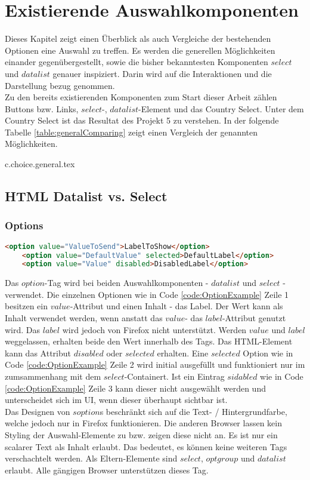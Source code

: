 \chapter{Existierende Auswahlkomponenten}

Dieses Kapitel zeigt einen Überblick als auch Vergleiche der bestehenden Optionen eine Auswahl zu treffen. 
Es werden die generellen Möglichkeiten einander gegenübergestellt, sowie die bisher bekanntesten Komponenten $select$ und $datalist$ genauer inspiziert.
Darin wird auf die Interaktionen und die Darstellung bezug genommen. 
\\
Zu den bereits existierenden Komponenten zum Start dieser Arbeit zählen Buttons bzw. Links, $select$-, $datalist$-Element und das Country Select.
Unter dem Country Select ist das Resultat des Projekt 5 zu verstehen.
In der folgende Tabelle \ref{table:generalComparing} zeigt einen Vergleich der genannten Möglichkeiten.

{c.choice.general.tex}


\section{HTML Datalist vs. Select}

\subsection{Options}

\begin{lstlisting}[language = html, caption = Code: Option Example, label = code:OptionExample]
    <option value="ValueToSend">LabelToShow</option>
    <option value="DefaultValue" selected>DefaultLabel</option>
    <option value="Value" disabled>DisabledLabel</option>
\end{lstlisting}

Das $option$-Tag wird bei beiden Auswahlkomponenten - $datalist$ und $select$ - verwendet. 
Die einzelnen Optionen wie in Code \ref{code:OptionExample} Zeile 1 besitzen ein $value$-Attribut und einen Inhalt - das Label.
Der Wert kann als Inhalt verwendet werden, wenn anstatt das $value$- das $label$-Attribut genutzt wird.
Das $label$ wird jedoch von Firefox nicht unterstützt.
Werden $value$ und $label$ weggelassen, erhalten beide den Wert innerhalb des Tags.
Das HTML-Element kann das Attribut $disabled$ oder $selected$ erhalten.
Eine $selected$ Option wie in Code \ref{code:OptionExample} Zeile 2 wird initial ausgefüllt und funktioniert nur im zumsammenhang mit dem $select$-Containert. 
Ist ein Eintrag $sidabled$ wie in Code \ref{code:OptionExample} Zeile 3 kann dieser nicht ausgewählt werden und unterscheidet sich im UI, wenn dieser überhaupt sichtbar ist.
\\
Das Designen von $soption$s beschränkt sich auf die Text- / Hintergrundfarbe, welche jedoch nur in Firefox funktionieren. 
Die anderen Browser lassen kein Styling der Auswahl-Elemente zu bzw. zeigen diese nicht an.
Es ist nur ein scalarer Text als Inhalt erlaubt. 
Das bedeutet, es können keine weiteren Tags verschachtelt werden.
Als Eltern-Elemente sind $select$, $optgroup$ und $datalist$ erlaubt.
Alle gängigen Browser unterstützen dieses Tag.



